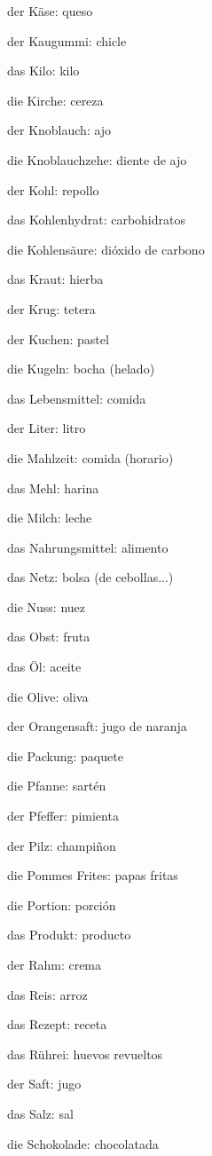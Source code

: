 \begin{multicols}{2}
\begin{myitemize}
\item der Käse: queso
\item der Kaugummi: chicle
\item das Kilo: kilo
\item die Kirche: cereza
\item der Knoblauch: ajo
\item die Knoblauchzehe: diente de ajo
\item der Kohl: repollo
\item das Kohlenhydrat: carbohidratos
\item die Kohlensäure: dióxido de carbono
\item das Kraut: hierba
\item der Krug: tetera
\item der Kuchen: pastel
\item die Kugeln: bocha (helado)
\item das Lebensmittel: comida
\item der Liter: litro
\item die Mahlzeit: comida (horario)
\item das Mehl: harina
\item die Milch: leche
\item das Nahrungsmittel: alimento
\item das Netz: bolsa (de cebollas...)
\item die Nuss: nuez
\item das Obst: fruta
\item das Öl: aceite
\item die Olive: oliva
\item der Orangensaft: jugo de naranja
\item die Packung: paquete
\item die Pfanne: sartén
\item der Pfeffer: pimienta
\item der Pilz: champiñon
\item die Pommes Frites: papas fritas
\item die Portion: porción
\item das Produkt: producto
\item der Rahm: crema
\item das Reis: arroz
\item das Rezept: receta
\item das Rührei: huevos revueltos
\item der Saft: jugo
\item das Salz: sal
\item die Schokolade: chocolatada

\end{myitemize}
\end{multicols}
